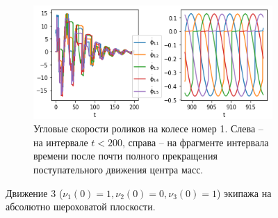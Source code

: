 \begin{figure}[htb]
\begin{subfigure}[t]{\textwidth}
            \label{fig:wrench_traj}
        \end{subfigure}
        \begin{subfigure}[t]{\textwidth}
            \vspace{20pt}
            \centering
            \includegraphics[width=\linewidth]{content/pic/new/impact/impact_3_dphi.png}
            \vspace{-25pt}
            \caption{Угловые скорости роликов на колесе номер 1. Слева -- на интервале $t < 200$, справа -- на фрагменте интервала времени после почти полного прекращения поступательного движения центра масс.}
            \label{fig:wrench_dphi}
        \end{subfigure}
    \endminipage

    \caption{Движение 3 ($\nu_{1}(0) = 1, \nu_{2}(0) = 0, \nu_{3}(0) = 1$) экипажа на абсолютно шероховатой плоскости.}
    \label{fig:wrench}
\end{figure}

